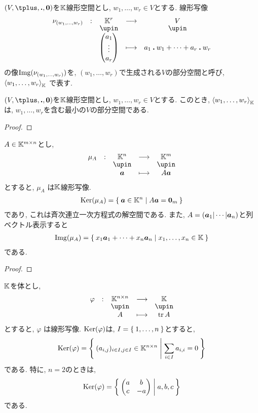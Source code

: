 \begin{definition}
  $(V,\plus,\act,\zzero)$を$\mathbb{K}$線形空間とし,
  $w_1,\ldots,w_r\in V$とする.
  線形写像
    \begin{align*}
      \shazo{\nu_{(w_1,\ldots,w_r)}}{\KK^r}{V}
      {\begin{pmatrix}a_1\\\vdots\\a_r\end{pmatrix}}{a_1\act w_1+\cdots+a_r\act w_r}
    \end{align*}
  の像$\operatorname{Img}(\nu_{(w_1,\ldots,w_r)})$を,
  $(w_1,\ldots,w_r)$で生成される$V$の部分空間と呼び,
  $\Braket{w_1,\ldots,w_r}_{\mathbb{K}}$
  で表す.  
\end{definition}
\begin{remark}
  $(V,\plus,\act,\zzero)$を$\mathbb{K}$線形空間とし,
  $w_1,\ldots,w_r\in V$とする.
  このとき,
  $\Braket{w_1,\ldots,w_r}_{\mathbb{K}}$
  は,
  $w_1,\ldots,w_r$を含む最小の$V$の部分空間である.
\end{remark}
\begin{proof}\end{proof}

\begin{example}
  $A\in \mathbb{K}^{m\times n}$とし,
  \begin{align*}
    \shazo{\mu_A}{\KK^{n}}{\KK^{m}}
    {\aaa}{A\aaa}
  \end{align*}
  とすると, $\mu_A$
  は$\mathbb{K}$線形写像.
  \begin{align*}
    \operatorname{Ker}(\mu_A)=\Set{\boldsymbol{a}\in\mathbb{K}^n|A\boldsymbol{a}=\boldsymbol{0}_m}
  \end{align*}
  であり, これは斉次連立一次方程式の解空間である.
  また, $A=(\boldsymbol{a}_1|\cdots|\boldsymbol{a}_n)$と列ベクトル表示すると
  \begin{align*}
    \operatorname{Img}(\mu_A)=\Set{x_1\boldsymbol{a}_1+\cdots+x_n\boldsymbol{a}_n|x_1,\ldots,x_n\in \mathbb{K}}
  \end{align*}
  である.
\end{example}
\begin{proof}\end{proof}

\begin{example}
$\mathbb{K}$を体とし,  
  \begin{align*}
    \shazo{\varphi}{\KK^{n\times n}}{\KK}
    {A}{\tr A}
  \end{align*}
  とすると, $\varphi$
  は線形写像.
  $\operatorname{Ker}(\varphi)$は, $I=\Set{1,\dots,n}$とすると,
  \begin{align*}
    \operatorname{Ker}(\varphi)=
    \Set{(a_{i,j})_{i\in I,j\in I} \in\mathbb{K}^{n\times n}|\sum_{i\in I}a_{i,i}=0}
  \end{align*}
  である. 特に, $n=2$のときは,
  \begin{align*}
    \operatorname{Ker}(\varphi)=
    \Set{\begin{pmatrix}a&b\\c&-a\end{pmatrix}|a,b,c}
  \end{align*}
  である.
\end{example}

